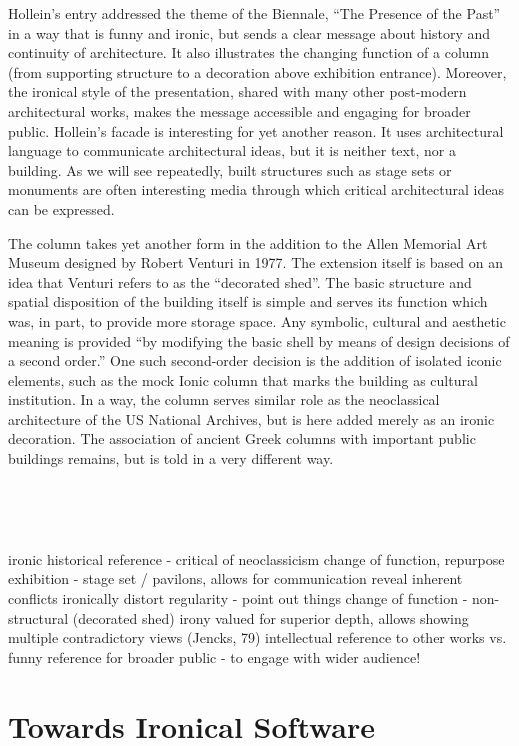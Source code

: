 Hollein's entry addressed the theme of the
Biennale, ``The Presence of the Past'' in a way that is funny and ironic, but sends a clear
message about history and continuity of architecture. It also illustrates the changing function
of a column (from supporting structure to a decoration above exhibition entrance). Moreover, the
ironical style of the presentation, shared with many other post-modern architectural works, makes
the message accessible and engaging for broader public. Hollein's facade is interesting for
yet another reason. It uses architectural language to communicate architectural ideas, but it
is neither text, nor a building. As we will see repeatedly, built structures such as stage sets
or monuments are often interesting media through which critical architectural ideas can be
expressed.

The column takes yet another form in the addition to the Allen Memorial Art Museum designed by
Robert Venturi in 1977. The extension itself is based on an idea that Venturi refers to as
the ``decorated shed''. The basic structure and spatial disposition of the building itself is
simple and serves its function which was, in part, to provide more storage space.
Any symbolic, cultural and aesthetic meaning is provided ``by modifying the basic shell by means
of design decisions of a second order.'' One such second-order
decision is the addition of isolated iconic elements, such as the mock Ionic column that
marks the building as cultural institution. In a way, the column serves similar role as the
neoclassical architecture of the US National Archives, but is here added merely as an ironic
decoration. The association of ancient Greek columns with important public buildings remains,
but is told in a very different way.

~

~

ironic historical reference - critical of neoclassicism
change of function, repurpose
exhibition - stage set / pavilons, allows for communication
reveal inherent conflicts
ironically distort regularity - point out things
change of function - non-structural (decorated shed)
irony valued for superior depth, allows showing multiple contradictory views (Jencks, 79)
intellectual reference to other works vs. funny reference for broader public - to engage with wider audience!

\section{Towards Ironical Software}


